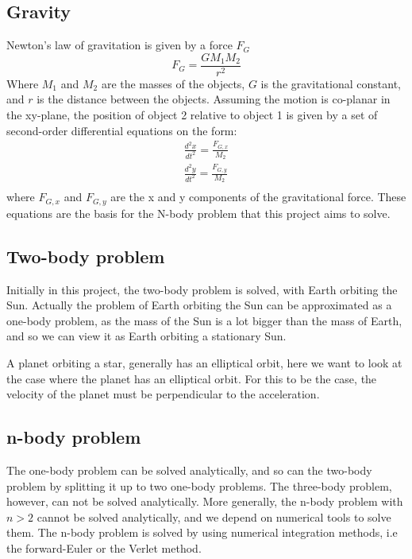 \subsection{Gravity}
Newton's law of gravitation is given by a force $F_G$
\begin{equation}\label{eq:grav}
F_G = \frac{GM_1M_2}{r^2}
\end{equation}
Where $M_1$ and $M_2$ are the masses of the objects, $G$ is the gravitational constant, and $r$ 
is the distance between the objects.
Assuming the motion is co-planar in the xy-plane, the position of object 2 relative to  
object 1 is given by a set of second-order differential equations on the form:
\begin{align*}
\frac{d^2x}{dt^2} = \frac{F_{G,x}}{M_2} \\
\frac{d^2y}{dt^2} = \frac{F_{G,y}}{M_2} \\
\end{align*}
where $F_{G,x}$ and $F_{G,y}$ are the x and y components of the gravitational force.
These equations are the basis for the N-body problem that this project aims to solve.

\subsection{Two-body problem}

Initially in this project, the two-body problem is solved, with Earth orbiting the Sun. Actually the problem of Earth orbiting the Sun can be approximated as a one-body problem, as the mass of the Sun is a lot bigger than the mass of Earth, and so we can view it as Earth orbiting a stationary Sun. 

A planet orbiting a star, generally has an elliptical orbit, here we want to look at the case where the planet has an elliptical orbit. For this to be the case, the velocity of the planet must be perpendicular to the acceleration. 



\subsection{n-body problem}
The one-body problem can be solved analytically, and so can the two-body problem by splitting it up to two one-body problems. The three-body problem, however, can not be solved analytically. More generally, the n-body problem with $n>2$ cannot be solved analytically, and we depend on numerical tools to solve them. The n-body problem is solved by using numerical integration methods, i.e the forward-Euler or the Verlet method. 

